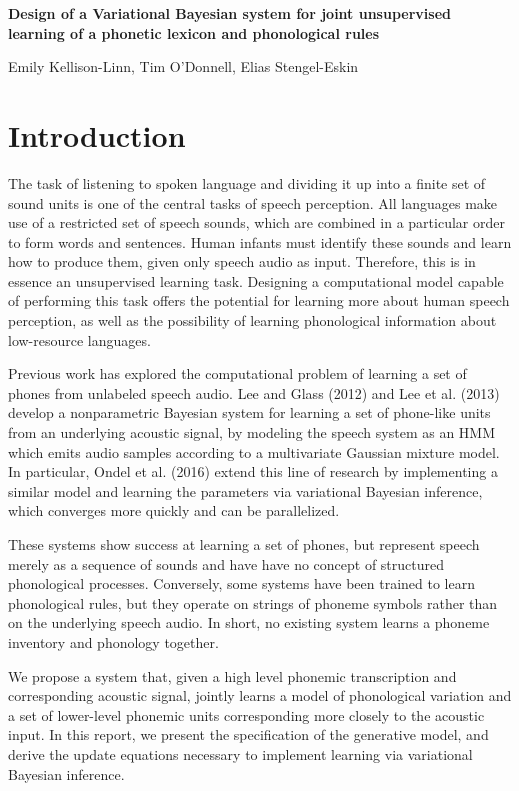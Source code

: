 \documentclass[11pt]{article}
\begin{document}
\begin{center}
	
	{\Large \textbf{Design of a Variational Bayesian system for joint unsupervised learning of a phonetic lexicon and phonological rules}}

	{\normalsize Emily Kellison-Linn, Tim O'Donnell, Elias Stengel-Eskin}
			
\end{center}

\section{Introduction}

The task of listening to spoken language and dividing it up into a finite set of sound units is one of the central tasks of speech perception. All languages make use of a restricted set of speech sounds, which are combined in a particular order to form words and sentences. Human infants must identify these sounds and learn how to produce them, given only speech audio as input. Therefore, this is in essence an unsupervised learning task. Designing a computational model capable of performing this task offers the potential for learning more about human speech perception, as well as the possibility of learning phonological information about low-resource languages.

Previous work has explored the computational problem of learning a set of phones from unlabeled speech audio. Lee and Glass (2012) and Lee et al. (2013) develop a nonparametric Bayesian system for learning a set of phone-like units from an underlying acoustic signal, by modeling the speech system as an HMM which emits audio samples according to a multivariate Gaussian mixture model. In particular, Ondel et al. (2016) extend this line of research by implementing a similar model and learning the parameters via variational Bayesian inference, which converges more quickly and can be parallelized.
 
These systems show success at learning a set of phones, but represent speech merely as a sequence of sounds and have have no concept of structured phonological processes. Conversely, some systems have been trained to learn phonological rules, but they operate on strings of phoneme symbols rather than on the underlying speech audio. In short, no existing system learns a phoneme inventory and phonology together.

We propose a system that, given a high level phonemic transcription and corresponding acoustic signal, jointly learns a model of phonological variation and a set of lower-level phonemic units corresponding more closely to the acoustic input. In this report, we present the specification of the generative model, and derive the update equations necessary to implement learning via variational Bayesian inference.
\end{document}
